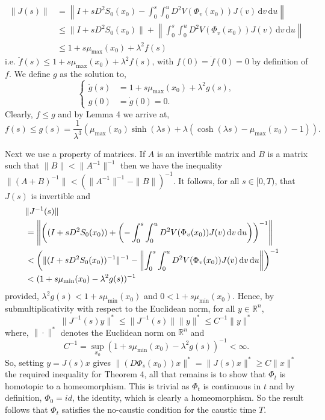 \documentclass[a4paper,12pt,draft]{report}
\theoremstyle{remark}
\theoremstyle{definition}
\begin{document}
{\begin{align}
\|J(s)\| & = \left\|I + sD^2S_0(x_0) - \int_0^s\int_0^u D^2V(\Phi_v(x_0))J(v)\,\mathrm{d}v\,\mathrm{d}u\right\|\nonumber\\
& \le \|I + sD^2S_0(x_0)\| + \left\|\int_0^s\int_0^u D^2V(\Phi_v(x_0))J(v)\,\mathrm{d}v\,\mathrm{d}u\right\| \nonumber\\
& \le 1 + s\mu_{\mathrm{max}}(x_0) + \lambda^2f(s)\nonumber
\end{align}
i.e. $\ddot{f}(s) \le 1 + s\mu_{\mathrm{max}}(x_0) + \lambda^2f(s)$, with $f(0) = \dot{f}(0) = 0$ by definition of $f$.  We define $g$ as the solution to,
$$
\left\{
\begin{aligned}
\ddot{g}(s) & = 1 + s\mu_{\mathrm{max}}(x_0) + \lambda^2g(s),\\
g(0) & = \dot{g}(0) = 0.
\end{aligned}
\right.
$$
Clearly, $f \le g$ and by Lemma 4 we arrive at,
$$
f(s) \le g(s) = \frac{1}{\lambda^3}(\mu_{\mathrm{max}}(x_0)\sinh(\lambda s) + \lambda(\cosh(\lambda s) - \mu_{\mathrm{max}}(x_0) - 1)).
$$

Next we use a property of matrices.  If $A$ is an invertible matrix and $B$ is a matrix such that $\|B\| < \|A^{-1}\|^{-1}$ then we have the inequality $\|(A + B)^{-1}\| < (\|A^{-1}\|^{-1} - \|B\|)^{-1}$.
It follows, for all $s \in [0, T)$, that $J(s)$ is invertible and
\begin{align}
\lefteqn{\|J^{-1}(s)\|}\nonumber\\
& = \left\|\left((I + sD^2S_0(x_0)) + \left(-\int_0^s\int_0^u D^2V(\Phi_v(x_0))J(v)\,\mathrm{d}v\,\mathrm{d}u\right)\right)^{-1}\right\|\nonumber\\
& < \left(\|(I + sD^2S_0(x_0))^{-1}\|^{-1} - \left\|\int_0^s\int_0^u D^2V(\Phi_v(x_0))J(v)\,\mathrm{d}v\,\mathrm{d}u\right\|\right)^{-1}\nonumber\\
& < (1 + s\mu_{\mathrm{min}}(x_0) - \lambda^2g(s))^{-1}\nonumber
\end{align}
provided, $\lambda^2g(s) < 1 + s\mu_{\mathrm{min}}(x_0)$ and $0 < 1 + s\mu_{\mathrm{min}}(x_0)$.  Hence, by submultiplicativity with respect to the Euclidean norm, for all $y \in \mathbb{R}^n$,
$$
\|J^{-1}(s)y\|^* \le \|J^{-1}(s)\|\|y\|^* \le C^{-1}\|y\|^*
$$
where, $\|\cdot\|^*$ denotes the Euclidean norm on $\mathbb{R}^n$ and 
$$
C^{-1} = \sup_{x_0}(1 + s\mu_{\mathrm{min}}(x_0) - \lambda^2g(s))^{-1} < \infty.
$$
So, setting $y = J(s)x$ gives $\|(D\Phi_s(x_0))x\|^* = \|J(s)x\|^* \ge C\|x\|^*$ the required inequality for Theorem 4, all that remains is to show that $\Phi_t$ is homotopic to a homeomorphism.  This is trivial as $\Phi_t$ is continuous in $t$ and by definition, $\Phi_0 = id$, the identity, which is clearly a homeomorphism.  So the result follows that $\Phi_t$ satisfies the no-caustic condition for the caustic time $T$.

\qedhere
}
\end{document}
